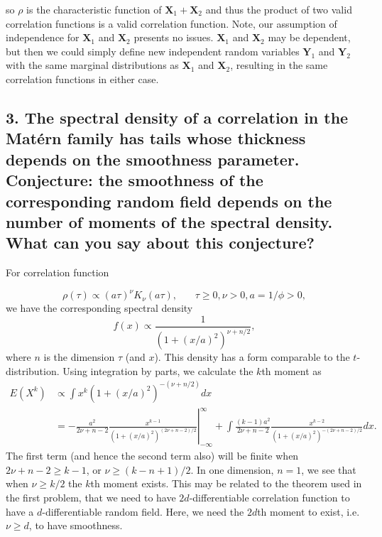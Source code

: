 \documentclass[12pt]{article}
\newcommand{\m}[1]{\mathbf{\bm{#1}}}
\begin{document}
so $\rho$ is the characteristic function of $\m{X}_1+\m{X}_2$ and thus the product of two valid correlation functions is a valid correlation function. Note, our assumption of independence for $\m{X}_1$ and $\m{X}_2$ presents no issues. $\m{X}_1$ and $\m{X}_2$ may be dependent, but then we could simply define new independent random variables $\m{Y}_1$ and $\m{Y}_2$ with the same marginal distributions as $\m{X}_1$ and $\m{X}_2$, resulting in the same correlation functions in either case.

\subsection*{3. The spectral density of a correlation in the Mat{\'e}rn family has tails whose thickness depends on the smoothness parameter. Conjecture: the smoothness of the corresponding random field depends on the number of moments of the spectral density. What can you say about this conjecture?}

For correlation function

\[ \rho(\tau) \propto (a\tau)^\nu K_\nu(a\tau),~~~~~~~~\tau\geq0,\nu>0,a=1/\phi>0, \]
we have the corresponding spectral density
\[ f(x) \propto \frac{1}{\left(1+(x/a)^2\right)^{\nu+n/2}}, \]
where $n$ is the dimension $\tau$ (and $x$). This density has a form comparable to the $t$-distribution. Using integration by parts, we calculate the $k$th moment as
\begin{align*}
E(X^k) &\propto \int x^k(1+(x/a)^2)^{-(\nu+n/2)} dx \\
 &= \left.-\frac{a^2}{2\nu+n-2}\frac{x^{k-1}}{(1+(x/a)^2)^{(2\nu+n-2)/2}}\right\vert_{-\infty}^{\infty}+\int\frac{(k-1)a^2}{2\nu+n-2}\frac{x^{k-2}}{(1+(x/a)^2)^{-(2\nu+n-2)/2}} dx.
\end{align*}
The first term (and hence the second term also) will be finite when $2\nu+n-2\geq k-1$, or $\nu\geq(k-n+1)/2$. In one dimension, $n=1$, we see that when $\nu \geq k/2$ the $k$th moment exists. This may be related to the theorem used in the first problem, that we need to have $2d$-differentiable correlation function to have a $d$-differentiable random field. Here, we need the $2d$th moment to exist, i.e. $\nu\geq d$, to have smoothness.
\end{document}
